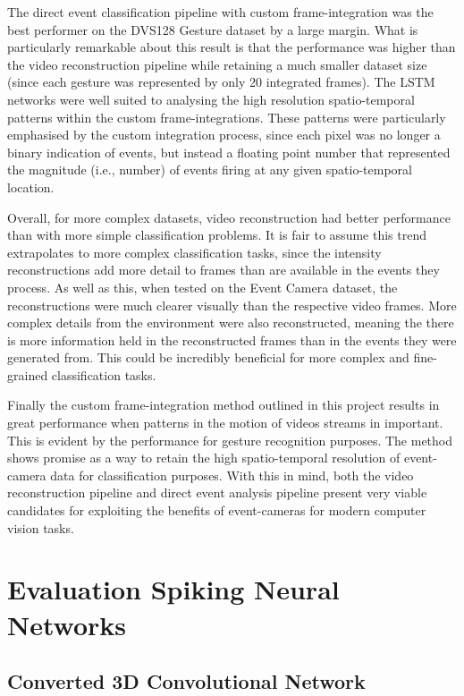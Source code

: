 The direct event classification pipeline with custom frame-integration was the best performer on the DVS128 Gesture dataset by a large margin. What is particularly remarkable about this result is that the performance was higher than the video reconstruction pipeline while retaining a much smaller dataset size (since each gesture was represented by only 20 integrated frames). The LSTM networks were well suited to analysing the high resolution spatio-temporal patterns within the custom frame-integrations. These patterns were particularly emphasised by the custom integration process, since each pixel was no longer a binary indication of events, but instead a floating point number that represented the magnitude (i.e., number) of events firing at any given spatio-temporal location. 

Overall, for more complex datasets, video reconstruction had better performance than with more simple classification problems. It is fair to assume this trend extrapolates to more complex classification tasks, since the intensity reconstructions add more detail to frames than are available in the events they process. As well as this, when tested on the Event Camera dataset, the reconstructions were much clearer visually than the respective video frames. More complex details from the environment were also reconstructed, meaning the there is more information held in the reconstructed frames than in the events they were generated from. This could be incredibly beneficial for more complex and fine-grained classification tasks. 

Finally the custom frame-integration method outlined in this project results in great performance when patterns in the motion of videos streams in important. This is evident by the performance for gesture recognition purposes. The method shows promise as a way to retain the high spatio-temporal resolution of event-camera data for classification purposes. With this in mind, both the video reconstruction pipeline and direct event analysis pipeline present very viable candidates for exploiting the benefits of event-cameras for modern computer vision tasks.

\section{Evaluation Spiking Neural Networks}

\subsection{Converted 3D Convolutional Network}

